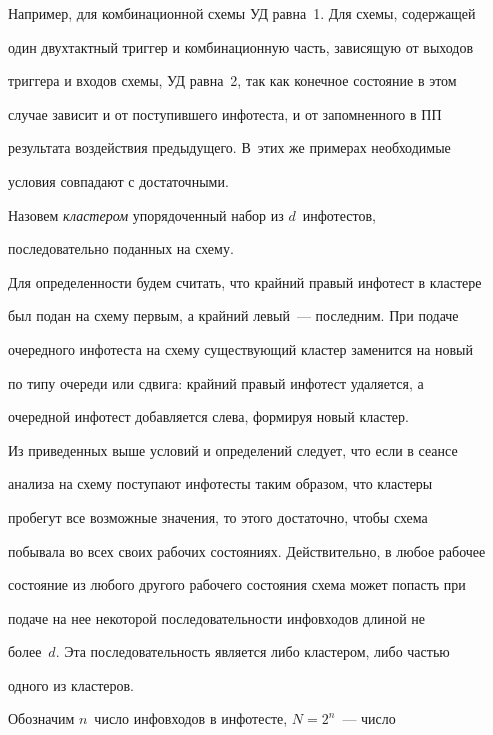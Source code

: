 Например, для комбинационной схемы УД равна~1. Для схе\-мы, содержащей 


один двухтактный триггер и комбинационную часть, зависящую от выходов 


триггера и входов схемы, УД рав\-на~2, так как конечное состояние в этом 


случае зависит и от поступившего инфотеста, и от запомненного в ПП 


результата воздействия предыду\-ще\-го. В~этих же примерах необходимые 


условия совпадают с достаточными.





Назовем \textit{кластером} упорядоченный набор из $d$~инфотестов, 


последовательно поданных на схему.





Для определенности будем считать, что крайний правый инфотест в кластере 


был подан на схему первым, а крайний левый~--- последним. При подаче 


очередного инфотеста на схему существующий кластер заменится на новый 


по типу очереди или сдвига: крайний правый инфотест удаляется, а 


очередной инфотест добавляется слева, формируя новый кластер.





Из приведенных выше условий и определений следует, что если в сеансе 


анализа на схему поступают инфотесты таким образом, что кластеры 


пробегут все возможные значения, то этого достаточно, чтобы схема 


побывала во всех своих рабочих состояниях. Действительно, в любое рабочее 


состояние из любого другого рабочего состояния схема может попасть при 


подаче на нее некоторой последовательности инфовходов длиной не 


более~$d$. Эта последовательность является либо кластером, либо частью 


одного из кластеров.





Обозначим $n$~число инфовходов в инфотесте, $N = 2^n$~--- число 


